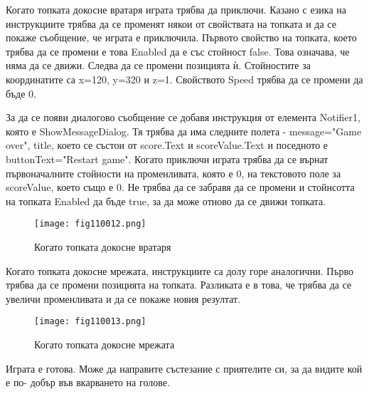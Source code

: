 Когато топката докосне вратаря играта трябва да приключи. Казано с езика на инструкциите трябва да се променят някои от свойствата на топката и да се покаже съобщение, че играта е приключила. Първото свойство на топката, което трябва да се промени е това Enabled да е със стойност false. Това означава, че няма да се движи. Следва да се промени позицията ѝ. Стойностите за координатите са x=120, y=320 и z=1. Свойството Speed трябва да се промени да бъде 0.

За да се появи диалогово съобщение се добавя инструкция от елемента Notifier1, която е ShowMessageDialog. Тя трябва да има следните полета - message="Game over", title, което се състои от score.Text и scoreValue.Text и поседното е buttonText="Restart game". Когато приключи играта трябва да се върнат първоначалните стойности на променливата, която е 0, на текстовото поле за scoreValue, което също е 0. Не трябва да се забравя да се промени и стойнсотта на топката Enabled да бъде true, за да може отново да се движи топката.

\begin{figure}[H]
  \centering
  \texttt{[image: fig110012.png]}
  \caption{Когато топката докосне вратаря}
\label{fig110012}
\end{figure}

Когато топката докосне мрежата, инструкциите са долу горе аналогични. Първо трябва да се промени позицията на топката. Разликата е в това, че трябва да се увеличи променливата и да се покаже новия резултат.

\begin{figure}[H]
  \centering
  \texttt{[image: fig110013.png]}
  \caption{Когато топката докосне мрежата}
\label{fig110013}
\end{figure}

Играта е готова. Може да направите състезание с приятелите си, за да видите кой е по- добър във вкарването на голове.